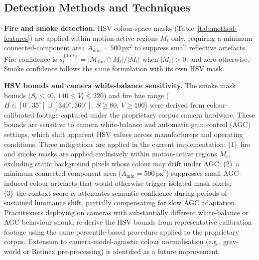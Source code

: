 \documentclass[sensors,article,submit,pdftex,moreauthors]{Definitions/mdpi}
\begin{document}
\subsection{Detection Methods and Techniques}
 
\textbf{Fire and smoke detection.} HSV colour-space masks (Table~\ref{tab:method-features}) are applied within motion-active regions $M_t$ only, requiring a minimum connected-component area $A_{\min} = 500$\,px$^2$ to suppress small reflective artefacts. Fire confidence is $s_t^{(\text{fire})} = |\mathcal{M}_{\text{fire}} \cap M_t| / |M_t|$ when $|M_t| > 0$, and zero otherwise. Smoke confidence follows the same formulation with its own HSV mask.
 
\textbf{HSV bounds and camera white-balance sensitivity.}
The smoke mask bounds ($S_t \le 40$, $140 \le V_t \le 220$) and fire hue range ($H \in [0^\circ,35^\circ]\cup[340^\circ,360^\circ]$, $S \ge 80$, $V \ge 100$) were derived from colour-calibrated footage captured under the proprietary corpus camera hardware. These bounds are sensitive to camera white-balance and automatic gain control (AGC) settings, which shift apparent HSV values across manufacturers and operating conditions. Three mitigations are applied in the current implementation: (1)~fire and smoke masks are applied exclusively within motion-active regions $M_t$, excluding static background pixels whose colour may drift under AGC; (2)~a minimum connected-component area ($A_{\min} = 500$\,px$^2$) suppresses small AGC-induced colour artefacts that would otherwise trigger isolated mask pixels; (3)~the context score $c_t$ attenuates semantic confidence during periods of sustained luminance shift, partially compensating for slow AGC adaptation. Practitioners deploying on cameras with substantially different white-balance or AGC behaviour should re-derive the HSV bounds from representative calibration footage using the same percentile-based procedure applied to the proprietary corpus. Extension to camera-model-agnostic colour normalisation (e.g., grey-world or Retinex pre-processing) is identified as a future improvement.
 
\end{document}
